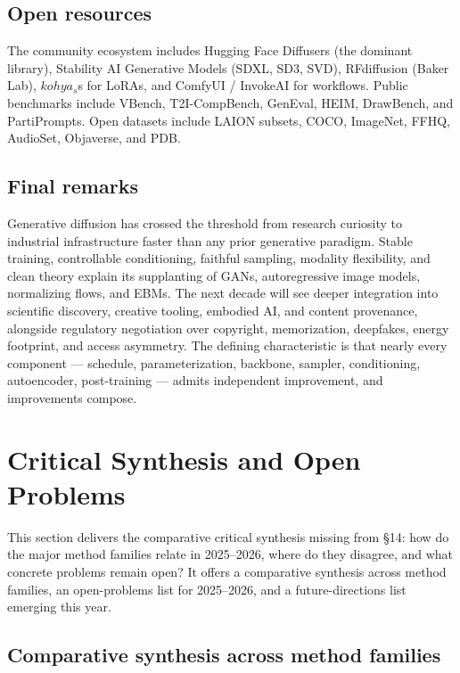 \documentclass{article}
\begin{document}
\subsection{Open resources}\label{open-resources}

The community ecosystem includes Hugging Face Diffusers (the dominant library), Stability AI Generative Models (SDXL, SD3, SVD), RFdiffusion (Baker Lab), \(kohya_s\)s for LoRAs, and ComfyUI / InvokeAI for workflows. Public benchmarks include VBench, T2I-CompBench, GenEval, HEIM, DrawBench, and PartiPrompts. Open datasets include LAION subsets, COCO, ImageNet, FFHQ, AudioSet, Objaverse, and PDB.

\subsection{Final remarks}\label{final-remarks}

Generative diffusion has crossed the threshold from research curiosity to industrial infrastructure faster than any prior generative paradigm. Stable training, controllable conditioning, faithful sampling, modality flexibility, and clean theory explain its supplanting of GANs, autoregressive image models, normalizing flows, and EBMs. The next decade will see deeper integration into scientific discovery, creative tooling, embodied AI, and content provenance, alongside regulatory negotiation over copyright, memorization, deepfakes, energy footprint, and access asymmetry. The defining characteristic is that nearly every component --- schedule, parameterization, backbone, sampler, conditioning, autoencoder, post-training --- admits independent improvement, and improvements compose.

\section{Critical Synthesis and Open Problems}\label{critical-synthesis-and-open-problems}

This section delivers the comparative critical synthesis missing from §14: how do the major method families relate in 2025--2026, where do they disagree, and what concrete problems remain open? It offers a comparative synthesis across method families, an open-problems list for 2025--2026, and a future-directions list emerging this year.

\subsection{Comparative synthesis across method families}\label{comparative-synthesis-across-method-families}
\end{document}
